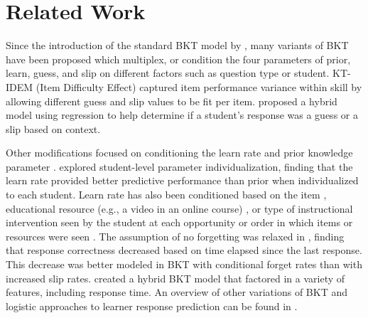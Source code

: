\documentclass{edm_article}
\begin{document}
\section{Related Work}


Since the introduction of the standard BKT model by \citet{corbett1994knowledge}, many variants of BKT have been proposed which multiplex, or condition the four parameters of prior, learn, guess, and slip on different factors such as question type or student. KT-IDEM (Item Difficulty Effect) \cite{pardos2011kt} captured item performance variance within skill by allowing different guess and slip values to be fit per item. \citet{d2008more} proposed a hybrid model using regression to help determine if a student's response was a guess or a slip based on context. 

Other modifications focused on conditioning the learn rate and prior knowledge parameter \cite{pardos2010modeling}. \citet{yudelson2013individualized} explored student-level parameter individualization, finding that the learn rate provided better predictive performance than prior when individualized to each student. Learn rate has also been conditioned based on the item \cite{pardos2009detecting}, educational resource (e.g., a video in an online course) \cite{pardos2013adapting}, or type of instructional intervention seen by the student at each opportunity \cite{lin2016intervention} or order in which items or resources were seen \cite{pardos2009determining}. The assumption of no forgetting was relaxed in \citet{qiu2011does}, finding that response correctness decreased based on time elapsed since the last response. This decrease was better modeled in BKT with conditional forget rates than with increased slip rates. \citet{gonzalez2014general} created a hybrid BKT model that factored in a variety of features, including response time. An overview of other variations of BKT and logistic approaches to learner response prediction can be found in \citet{pelanek2017bayesian}.  
\end{document}
